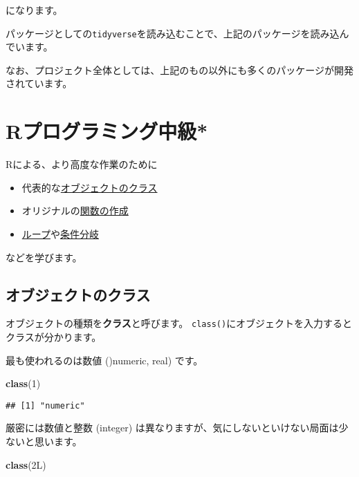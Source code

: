 \documentclass[]{bxjsarticle}
\newenvironment{Shaded}{\begin{snugshade}}{\end{snugshade}}
\newcommand{\DecValTok}[1]{\textcolor[rgb]{0.00,0.00,0.81}{#1}}
\newcommand{\KeywordTok}[1]{\textcolor[rgb]{0.13,0.29,0.53}{\textbf{#1}}}
\newcommand{\NormalTok}[1]{#1}
\providecommand{\tightlist}{%
  \setlength{\itemsep}{0pt}\setlength{\parskip}{0pt}}
\begin{document}
になります。

パッケージとしての\texttt{tidyverse}を読み込むことで、上記のパッケージを読み込んでいます。

なお、プロジェクト全体としては、上記のもの以外にも多くのパッケージが開発されています。

\hypertarget{inter-r}{%
\section{Rプログラミング中級*}\label{inter-r}}

Rによる、より高度な作業のために

\begin{itemize}
\tightlist
\item
  代表的な\protect\hyperlink{ux30aaux30d6ux30b8ux30a7ux30afux30c8ux306eux30afux30e9ux30b9}{オブジェクトのクラス}
\item
  オリジナルの\protect\hyperlink{ux95a2ux6570ux306eux4f5cux6210}{関数の作成}
\item
  \protect\hyperlink{ux30ebux30fcux30d7}{ループ}や\protect\hyperlink{ux6761ux4ef6ux5206ux5c90}{条件分岐}
\end{itemize}

などを学びます。

\hypertarget{ux30aaux30d6ux30b8ux30a7ux30afux30c8ux306eux30afux30e9ux30b9}{%
\subsection{オブジェクトのクラス}\label{ux30aaux30d6ux30b8ux30a7ux30afux30c8ux306eux30afux30e9ux30b9}}

オブジェクトの種類を\textbf{クラス}と呼びます。
\texttt{class()}にオブジェクトを入力するとクラスが分かります。

最も使われるのは数値 ()numeric, real) です。

\begin{Shaded}
\begin{Highlighting}[]
\KeywordTok{class}\NormalTok{(}\DecValTok{1}\NormalTok{)}
\end{Highlighting}
\end{Shaded}

\begin{verbatim}
## [1] "numeric"
\end{verbatim}

厳密には数値と整数 (integer) は異なりますが、気にしないといけない局面は少ないと思います。

\begin{Shaded}
\begin{Highlighting}[]
\KeywordTok{class}\NormalTok{(2L)}
\end{Highlighting}
\end{Shaded}
\end{document}
